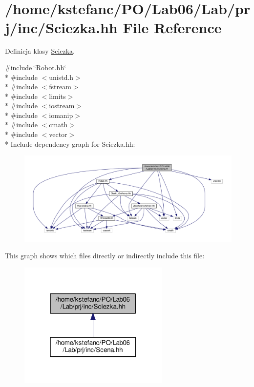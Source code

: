 \hypertarget{_sciezka_8hh}{\section{/home/kstefanc/\+P\+O/\+Lab06/\+Lab/prj/inc/\+Sciezka.hh File Reference}
\label{_sciezka_8hh}
}


Definicja klasy \hyperlink{class_sciezka}{Sciezka}.  


{\ttfamily \#include \char`\"{}Robot.\+hh\char`\"{}}\\*
{\ttfamily \#include $<$unistd.\+h$>$}\\*
{\ttfamily \#include $<$fstream$>$}\\*
{\ttfamily \#include $<$limits$>$}\\*
{\ttfamily \#include $<$iostream$>$}\\*
{\ttfamily \#include $<$iomanip$>$}\\*
{\ttfamily \#include $<$cmath$>$}\\*
{\ttfamily \#include $<$vector$>$}\\*
Include dependency graph for Sciezka.\+hh\+:\nopagebreak
\begin{figure}[H]
\begin{center}
\leavevmode
\includegraphics[width=350pt]{_sciezka_8hh__incl}
\end{center}
\end{figure}
This graph shows which files directly or indirectly include this file\+:\nopagebreak
\begin{figure}[H]
\begin{center}
\leavevmode
\includegraphics[width=211pt]{_sciezka_8hh__dep__incl}
\end{center}
\end{figure}
